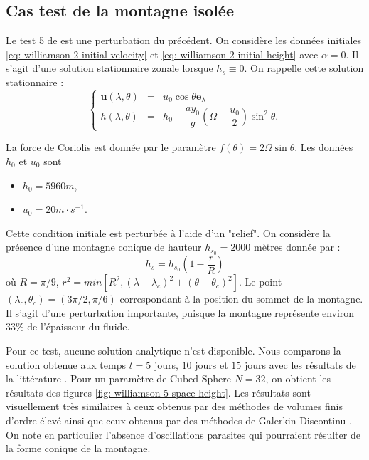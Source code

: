 \subsection{Cas test de la montagne isolée}

Le test 5 de \cite{Williamson1992} est une perturbation du précédent.
On considère les données initiales \eqref{eq: williamson 2 initial velocity} et \eqref{eq: williamson 2 initial height} avec $\alpha = 0$. Il s'agit d'une solution stationnaire zonale lorsque $h_s \equiv 0$. On rappelle cette solution stationnaire :
\begin{equation}
\left\lbrace
\begin{array}{rcl}
\mathbf{u}(\lambda, \theta) & = & u_0 \cos \theta \mathbf{e}_{\lambda} \\
h(\lambda, \theta) & = & h_0 - \dfrac{a y_0}{g} \left( \Omega  + \dfrac{u_0}{2} \right) \sin^2 \theta .
\end{array}
\right.
\end{equation}

La force de Coriolis est donnée par le paramètre $f(\theta) = 2 \Omega \sin \theta$. Les données $h_0$ et $u_0$ sont
\begin{itemize}
\item $h_0 = 5960 \si{m}$,
\item $u_0 = 20 \si{m} \cdot \si{s^{-1}}$.
\end{itemize}
Cette condition initiale est perturbée à l'aide d'un "relief".
On considère la présence d'une montagne conique de hauteur $h_{s_0} = 2000$ mètres donnée par :
\begin{equation}
h_s = h_{s_0} \left( 1 - \dfrac{r}{R} \right)
\end{equation}
où $R= \pi / 9$, $r^2 = min \left[ R^2, \left( \lambda - \lambda_c \right)^2 + \left( \theta - \theta_c \right)^2 \right]$. Le point $(\lambda_c, \theta_c)= (3 \pi / 2, \pi / 6)$ correspondant à la position du sommet de la montagne.
Il s'agit d'une perturbation importante, puisque la montagne représente environ $33 \%$ de l'épaisseur du fluide.

Pour ce test, aucune solution analytique n'est disponible. Nous comparons la solution obtenue aux temps $t=5$ jours, $10$ jours et $15$ jours avec les résultats de la littérature \cite{Ullrich2011, Kuang2016}. Pour un paramètre de Cubed-Sphere $N=32$, on obtient les résultats des figures \ref{fig: williamson 5 space height}. Les résultats sont visuellement très similaires à ceux obtenus par des méthodes de volumes finis \cite{Katta2015, Chen2008} d'ordre élevé ainsi que ceux obtenus par des méthodes de Galerkin Discontinu \cite{Nair2005}. On note en particulier l'absence d'oscillations parasites qui pourraient résulter de la forme conique de la montagne.

